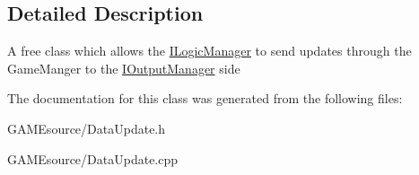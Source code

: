 \subsection{Detailed Description}
A free class which allows the \mbox{\hyperlink{class_i_logic_manager}{I\+Logic\+Manager}} to send updates through the Game\+Manger to the \mbox{\hyperlink{class_i_output_manager}{I\+Output\+Manager}} side 

The documentation for this class was generated from the following files\+:\begin{DoxyCompactItemize}
\item 
G\+A\+M\+Esource/Data\+Update.\+h\item 
G\+A\+M\+Esource/Data\+Update.\+cpp\end{DoxyCompactItemize}
